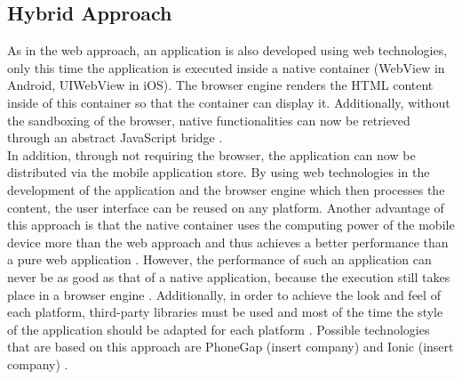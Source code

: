 \documentclass[Bachelor,BIF,english]{twbook}
\begin{document}
\subsection{Hybrid Approach}
As in the web approach, an application is also developed using web technologies, only this time the application is executed inside a native container (WebView in Android, UIWebView in iOS). The browser engine renders the HTML content inside of this container so that the container can display it. Additionally, without the sandboxing of the browser, native functionalities can now be retrieved through an abstract JavaScript bridge \cite[p.~626]{6420693} \cite[p.~2]{7479278}. 
\\[\baselineskip]
In addition, through not requiring the browser, the application can now be distributed via the mobile application store. By using web technologies in the development of the application and the browser engine which then processes the content, the user interface can be reused on any platform. Another advantage of this approach is that the native container uses the computing power of the mobile device more than the web approach and thus achieves a better performance than a pure web application \cite[p.~626]{6420693}. However, the performance of such an application can never be as good as that of a native application, because the execution still takes place in a browser engine \cite[p.~2]{7479278}. Additionally, in order to achieve the look and feel of each platform, third-party libraries must be used and most of the time the style of the application should be adapted for each platform \cite[p.~627]{6420693}. Possible technologies that are based on this approach are PhoneGap (insert company) and Ionic (insert company) \cite[p.~2]{7934674}.
\end{document}
